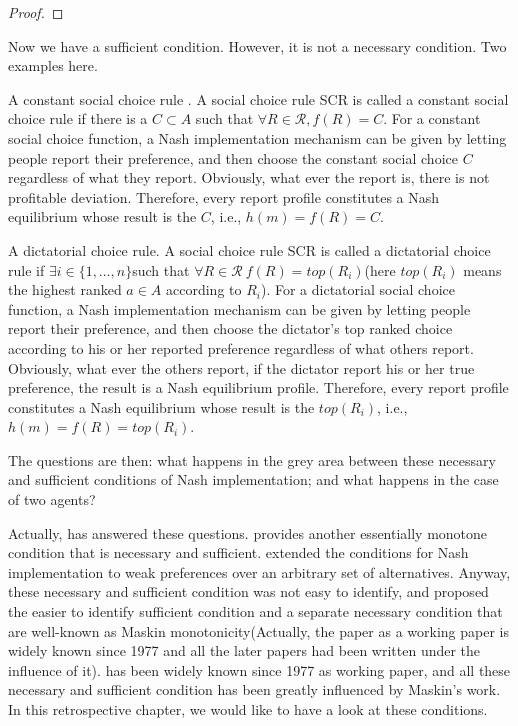 \begin{proof}

\end{proof}

Now we have a sufficient condition. However, it is not a necessary
condition. Two examples here.

\begin{example}
A constant social choice rule . A social choice rule SCR is called
a constant  social choice rule if  there is a $ C \subset A$ such that
$ \forall R \in \mathscr{R}, f(R) = C$. For a constant social choice
function, a Nash implementation mechanism can be given by letting  people
report their preference, and then choose the constant social choice
$C$ regardless of what they report.  Obviously, what ever the report
is, there is not profitable deviation. Therefore, every report profile
constitutes a Nash equilibrium whose result is the $C$, i.e., $h(m)=f(R)=C$.
\end{example}

\begin{example}
A  dictatorial  choice  rule. A social choice rule SCR is called a
dictatorial choice rule if $\exists i \in \{1,\dots,n\} $such that
$\forall R \in \mathscr{R}\  f(R) = top(R_i)$(here $top(R_i)$ means
the highest ranked $a \in A$ according to $R_i$). For a dictatorial
social choice function, a Nash implementation mechanism can be given by letting  people
report their preference, and then choose the dictator's top ranked
choice according to his or her reported preference regardless of what
others report. Obviously, what ever the others report, if the dictator
report his or her true preference, the result is a Nash equilibrium
profile. Therefore, every report profile
constitutes a Nash equilibrium whose result is the $top(R_i)$, i.e., $h(m)=f(R)=top(R_i)$.
\end{example}

The questions  are then:  what happens  in  the  grey  area  between
these  necessary and sufficient conditions of Nash implementation; and
what  happens  in the case  of two  agents? 


Actually, \parencite{Repullo90} has answered these questions.
\parencite{Danilov1992} provides another essentially monotone condition
that is  necessary and sufficient. \parencite{Yamato1992} extended the
\parencite{Danilov1992}  conditions for Nash implementation to weak
preferences over an arbitrary set of alternatives. Anyway,
these necessary  and sufficient  condition was not easy to identify,
and  \parencite{Maskin1999} proposed the easier to identify
sufficient condition and a separate necessary condition that are
well-known as Maskin monotonicity(Actually, the paper as a working paper is widely known since 1977 and all the later papers
 had been written under the influence of it).   \parencite{Maskin1999} has been
widely known since 1977 as working paper, and all these necessary and
sufficient condition has been greatly influenced by Maskin's work. In this retrospective
chapter, we would like
to have a look at these conditions. 

